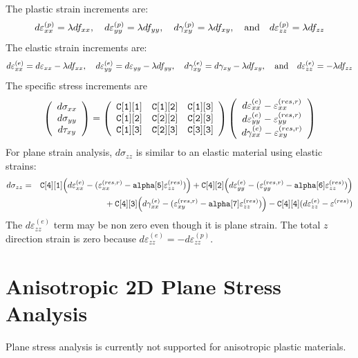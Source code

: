 \documentclass[11pt]{book}
\def\code#1{{\small\tt #1}}
\def\e#1{\varepsilon_{#1}}
\def\er#1{\varepsilon_{#1}^{(res)}}
\def\err#1{\varepsilon_{#1}^{(res,r)}}
\def\g#1{\gamma_{#1}}
\def\s#1{\sigma_{#1}}
\def\t#1{\tau_{#1}}
\def\vvec#1#2#3{\left(\begin{array}{ccc} #1 \\ #2 \\ #3 \end{array}\right)}
\begin{document}
 The plastic strain increments are:
\begin{equation}
       d\varepsilon_{xx}^{(p)} = \lambda df_{xx}, \quad
       d\varepsilon_{yy}^{(p)} = \lambda df_{yy}, \quad
       d\gamma_{xy}^{(p)} =  \lambda df_{xy}, \quad  {\rm and} \quad
       d\varepsilon_{zz}^{(p)} = \lambda df_{zz}
\end{equation}
The elastic strain increments are:
\begin{equation}
       d\varepsilon_{xx}^{(e)} = d\varepsilon_{xx} -\lambda df_{xx}, \quad
       d\varepsilon_{yy}^{(e)} = d\varepsilon_{yy} -\lambda df_{yy}, \quad
       d\gamma_{xy}^{(e)} = d\gamma_{xy} -  \lambda df_{xy}, \quad  {\rm and} \quad
       d\varepsilon_{zz}^{(e)} =  -\lambda df_{zz}
\end{equation}
The specific stress increments are
\begin{equation}
      \vvec{d\s{xx}}{d\s{yy}}{d\t{xy}} = \left(\begin{array}{ccc}
      		\code{C[1][1]} & \code{C[1][2]} & \code{C[1][3]}  \\
      		\code{C[1][2]} & \code{C[2][2]} & \code{C[2][3]}  \\
      		\code{C[1][3]} & \code{C[2][3]} & \code{C[3][3]} 
           \end{array}\right)
          \vvec{d\varepsilon_{xx}^{(e)}  - \err{xx}}{d\varepsilon_{yy}^{(e)}  -\err{yy}}{d\g{xx}^{(e)}-\err{xy}}
 \end{equation}
For plane strain analysis, $d\sigma_{zz}$ is similar to an elastic material using elastic strains:
 \begin{eqnarray}
     d\s{zz} & = & \code{C[4][1]} \Bigl(d\e{xx}^{(e)} -(\err{xx}-\code{alpha[5]}\er{zz})\Bigr)
                         +  \code{C[4][2]}\Bigl(d\e{yy}^{(e)} -(\err{yy}-\code{alpha[6]}\er{zz})\Bigr) 
     \nonumber \\
     && \qquad\qquad\mbox{}
                 + \code{C[4][3]}\Bigl(d\g{xx}^{(e)}-(\err{xy}-\code{alpha[7]}\er{zz})\Bigr)  - \code{C[4][4]}(d\e{zz}^{(e)}-\er{})
\end{eqnarray}
The $d\e{zz}^{(e)}$ term may be non zero even though it is plane strain. The total $z$ direction strain is zero because $d\e{zz}^{(e)} = -d\e{zz}^{(p)}$.

\section{Anisotropic 2D Plane Stress Analysis}

Plane stress analysis is currently not supported for anisotropic plastic materials.
\end{document}

